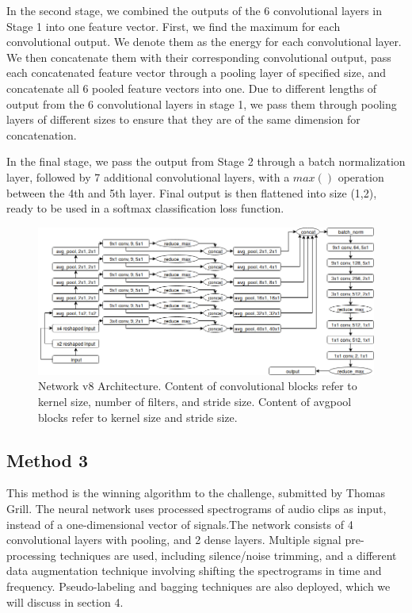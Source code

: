 \documentclass[10pt,twocolumn,letterpaper]{article}
\begin{document}
In the second stage, we combined the outputs of the 6 convolutional layers
in Stage 1 into one feature vector. First, we find the maximum for each
convolutional output. We denote them as the energy for each convolutional
layer. We then concatenate them with their corresponding convolutional
output, pass each concatenated feature vector through a pooling layer of
specified size, and concatenate all 6 pooled feature vectors into one. Due
to different lengths of output from the 6 convolutional layers in stage 1,
we pass them through pooling layers of different sizes to ensure that they
are of the same dimension for concatenation.

In the final stage, we pass the output from Stage 2 through a batch
normalization layer, followed by 7 additional convolutional layers, with a
\(max()\) operation between the 4th and 5th layer. Final output is then
flattened into size (1,2), ready to be used in a softmax classification
loss function.

\begin{figure}
	\centering
	\includegraphics[width=\textwidth]{v8_diagram}
	\caption{Network v8 Architecture. Content of convolutional blocks refer
	to kernel size, number of filters, and stride size. Content of avgpool
	blocks refer to kernel size and stride size.}
\end{figure}

\subsection{Method 3}


This method is the winning algorithm to the challenge, submitted by Thomas
Grill. The neural network uses processed spectrograms of audio clips as
input, instead of a one-dimensional vector of signals.The network consists
of 4 convolutional layers with pooling, and 2 dense layers. Multiple signal
pre-processing techniques are used, including silence/noise trimming, and a
different data augmentation technique involving shifting the spectrograms
in time and frequency.  Pseudo-labeling and bagging techniques are also
deployed, which we will discuss in section 4.
\end{document}
